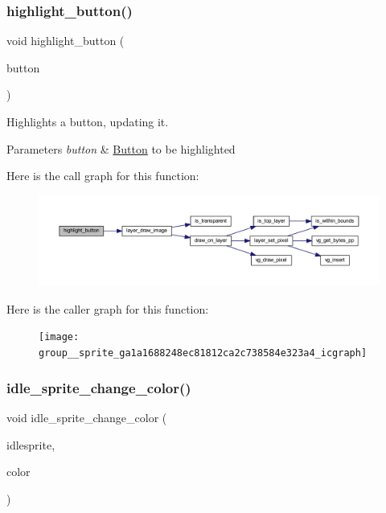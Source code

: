 \subsubsection{\texorpdfstring{highlight\+\_\+button()}{highlight\_button()}}
{\footnotesize\ttfamily void highlight\+\_\+button (\begin{DoxyParamCaption}\item[{\mbox{\hyperlink{struct_button}{Button}} $\ast$}]{button }\end{DoxyParamCaption})}



Highlights a button, updating it. 


\begin{DoxyParams}{Parameters}
{\em button} & \mbox{\hyperlink{struct_button}{Button}} to be highlighted \\
\hline
\end{DoxyParams}
Here is the call graph for this function\+:\nopagebreak
\begin{figure}[H]
\begin{center}
\leavevmode
\includegraphics[width=350pt]{group__sprite_ga1a1688248ec81812ca2c738584e323a4_cgraph}
\end{center}
\end{figure}
Here is the caller graph for this function\+:\nopagebreak
\begin{figure}[H]
\begin{center}
\leavevmode
\texttt{[image: group\_\_sprite\_ga1a1688248ec81812ca2c738584e323a4\_icgraph]}
\end{center}
\end{figure}
\mbox{\label{group__sprite_gabae3594520c7d515ffda965caae199af}} 
\subsubsection{\texorpdfstring{idle\+\_\+sprite\+\_\+change\+\_\+color()}{idle\_sprite\_change\_color()}}
{\footnotesize\ttfamily void idle\+\_\+sprite\+\_\+change\+\_\+color (\begin{DoxyParamCaption}\item[{\mbox{\hyperlink{struct_idle_sprite}{Idle\+Sprite}} $\ast$}]{idlesprite,  }\item[{uint32\+\_\+t}]{color }\end{DoxyParamCaption})}



